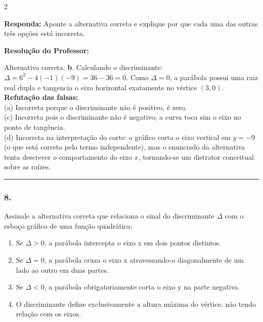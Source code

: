\begin{multicols*}{2}
\begin{boxresponda}
\textbf{Responda:} Aponte a alternativa correta e explique por que cada uma das outras três opções está incorreta.
\end{boxresponda}

\ifgabarito
    \begin{tcolorbox}[colback=CorTitUm!5, colframe=CorTitUm, boxrule=1pt, arc=4pt, left=6pt, right=6pt, top=6pt, bottom=6pt]
    \small\textbf{\textcolor{CorTitUm}{Resolução do Professor:}}\par\vspace{0.1cm}
    \color{CinzaEscuro}
    Alternativa correta: \textbf{b}. Calculando o discriminante: $\Delta = 6^2 - 4(-1)(-9) = 36 - 36 = 0$. Como $\Delta = 0$, a parábola possui uma raiz real dupla e tangencia o eixo horizontal exatamente no vértice $(3,0)$. \\
    \textbf{Refutação das falsas:} \\
    (a) Incorreta porque o discriminante não é positivo, é zero. \\
    (c) Incorreta pois o discriminante não é negativo; a curva toca sim o eixo no ponto de tangência. \\
    (d) Incorreta na interpretação do corte: o gráfico corta o eixo vertical em $y = -9$ (o que está correto pelo termo independente), mas o enunciado da alternativa tenta descrever o comportamento do eixo $x$, tornando-se um distrator conceitual sobre as raízes.
    \end{tcolorbox}
\fi

\par\vspace{\espacoQuestao}

\noindent\textcolor{CorLinha}{\rule{\linewidth}{0.5pt}} 
\par\vspace{\espacoPreQuestao}
\subsubsection*{8.} Assinale a alternativa correta que relaciona o sinal do discriminante $\Delta$ com o esboço gráfico de uma função quadrática:

\begin{enumerate}[label=\alph*), itemsep=\espacoAlt]
\item Se $\Delta > 0$, a parábola intercepta o eixo x em dois pontos distintos.
\item Se $\Delta = 0$, a parábola cruza o eixo x atravessando-o diagonalmente de um lado ao outro em duas partes.
\item Se $\Delta < 0$, a parábola obrigatoriamente corta o eixo y na parte negativa.
\item O discriminante define exclusivamente a altura máxima do vértice, não tendo relação com os eixos.
\end{enumerate}


\end{multicols*}
